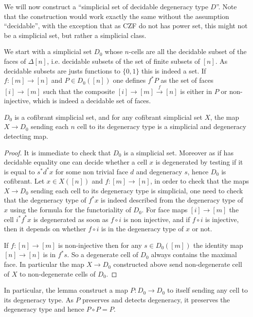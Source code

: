 \documentclass[reqno,10pt,a4paper,oneside,draft]{amsart}
\begin{document}
We will now construct a ``simplicial set of decidable degeneracy type $D$''. Note that the construction would work exactly the same without the assumption ``decidable'', with the exception that as CZF do not has power set, this might not be a simplicial set, but rather a simplicial class.


 We start with a simplicial set $D_0$ whose $n$-cells are all the decidable subset of the faces of $\Delta[n]$, i.e. decidable subsets of the set of finite subsets of $[n]$. As decidable subsets are justs functions to $\{0,1\}$ this is indeed a set.  If $f : [m] \rightarrow [n]$ and $P \in D_0([n])$ one defines $f^* P$ as the set of faces  $[i] \rightarrow [m]$ such that the composite $[i] \rightarrow [m] \overset{f}{\rightarrow} [n]$ is either in $P$ or non-injective, which is indeed a decidable set of faces.

\begin{lemma}
$D_0$ is a cofibrant simplicial set, and for any cofibrant simplicial set $X$, the map $X \rightarrow D_0$ sending each $n$ cell to its degeneracy type is a simplicial and degeneracy detecting map.
\end{lemma}

\begin{proof}
It is immediate to check that $D_0$ is a simplicial set. Moreover as if has decidable equality one can decide whether a cell $x$ is degenerated by testing if it is equal to $s^* d^* x$ for some non trivial face $d$ and degeneracy $s$, hence $D_0$ is cofibrant. Let $x \in X([n])$ and $f:[m] \rightarrow [n]$, in order to check that the maps $X \rightarrow D_0$ sending each cell to its degeneracy type is simplicial, one need to check that the degeneracy type of $f^* x$ is indeed described from the degeneracy type of $x$ using the formula for the functoriality of $D_0$. For face maps $[i] \rightarrow [m]$ the cell $i^* f^* x$ is degenerated as soon as $f \circ i$ is non injective, and if $f\circ i$ is injective, then it depends on whether $f \circ i$ is in the degeneracy type of $x$ or not.

If $f:[n] \rightarrow [m]$ is non-injective then for any $s \in D_0([m])$ the identity map $[n] \rightarrow [n]$ is in $f^* s$. So a degenerate cell of $D_0$ always contains the maximal face. In particular the map $X \rightarrow D_0$ constructed above send non-degenerate cell of $X$ to non-degenerate cells of $D_0$.

\end{proof}

In particular, the lemma construct a map $P:D_0 \rightarrow D_0$ to itself sending any cell to its degeneracy type. As $P$ preserves and detects degeneracy, it preserves the degeneracy type and hence $P \circ P =P$.
\end{document}
